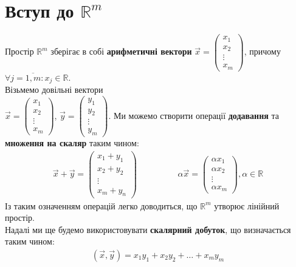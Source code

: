\documentclass[a4paper, 10pt]{article}
\theoremstyle{theoremdd}
\theoremstyle{theoremdd}
\theoremstyle{theoremdd}
\theoremstyle{theoremdd}
\theoremstyle{theoremdd}
\theoremstyle{theoremdd}
\theoremstyle{theoremdd}
\theoremstyle{theoremdd}
\begin{document}
\section{Вступ до $\mathbb{R}^m$}
Простір $\mathbb{R}^m$ зберігає в собі \textbf{арифметичні вектори} $\vec{x} = \begin{pmatrix}
x_1 \\ x_2 \\ \vdots \\ x_m
\end{pmatrix}$, причому $\forall j = \overline{1,m}: x_j \in \mathbb{R}$. \\
Візьмемо довільні вектори\\
$\vec{x} = \begin{pmatrix}
x_1 \\ x_2 \\ \vdots \\ x_m
\end{pmatrix}$, $\vec{y} = \begin{pmatrix}
y_1 \\ y_2 \\ \vdots \\ y_m
\end{pmatrix}$. Ми можемо створити операції \textbf{додавання} та \textbf{множення на скаляр} таким чином:
\begin{align*}
\vec{x} + \vec{y} = \begin{pmatrix}
x_1 + y_1 \\ x_2 + y_2 \\ \vdots \\ x_m + y_n
\end{pmatrix} \hspace{2cm} \alpha \vec{x} = \begin{pmatrix}
\alpha x_1 \\ \alpha x_2 \\ \vdots \\ \alpha x_m
\end{pmatrix}, \alpha \in \mathbb{R}
\end{align*}
Із таким означенням операцій легко доводиться, що $\mathbb{R}^m$ утворює лінійний простір.\\
Надалі ми ще будемо використовувати \textbf{скалярний добуток}, що визначається таким чином:
\begin{align*}
(\vec{x}, \vec{y}) = x_1 y_1 + x_2 y_2 + \dots + x_m y_m
\end{align*}
\end{document}
